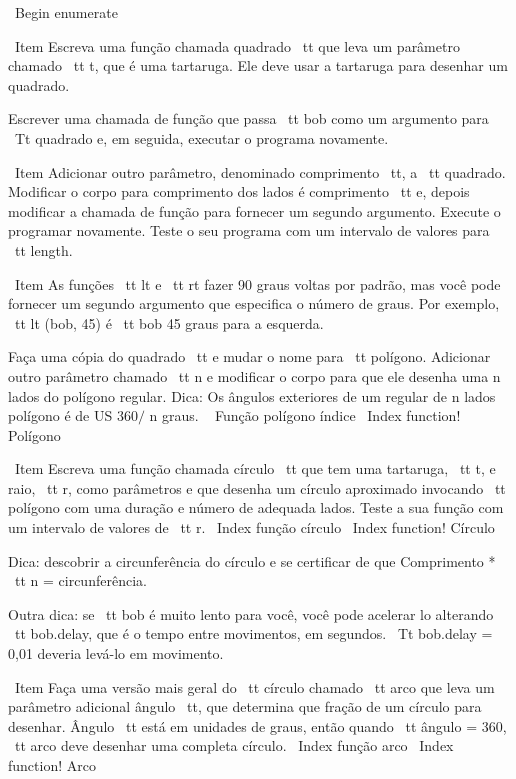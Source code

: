 \documentclass[10pt]{book}
\begin{document}
{\ Begin {enumerate}

\ Item Escreva uma função chamada {quadrado \ tt} que leva um parâmetro
chamado {\ tt t}, que é uma tartaruga. Ele deve usar a tartaruga para desenhar
um quadrado.

Escrever uma chamada de função que passa {\ tt bob} como um argumento para
{\ Tt quadrado} e, em seguida, executar o programa novamente.

\ Item Adicionar outro parâmetro, denominado {comprimento \ tt}, a {\ tt quadrado}.
Modificar o corpo para comprimento dos lados é {comprimento \ tt} e, depois
modificar a chamada de função para fornecer um segundo argumento. Execute o
programar novamente. Teste o seu programa com um intervalo de valores para {\ tt
length}.

\ Item As funções {\ tt lt} e {\ tt rt} fazer 90 graus voltas por
padrão, mas você pode fornecer um segundo argumento que especifica o
número de graus. Por exemplo, {\ tt lt (bob, 45)} é {\ tt bob} 45
graus para a esquerda.

Faça uma cópia do quadrado {\ tt} e mudar o nome para {\ tt polígono}. Adicionar
outro parâmetro chamado {\ tt n} e modificar o corpo para que ele desenha uma
n lados do polígono regular. Dica: Os ângulos exteriores de um regular de n lados
polígono é de US $ 360 / $ n graus.
\ {} Função polígono índice
\ Index {function! Polígono}

\ Item Escreva uma função chamada {círculo \ tt} que tem uma tartaruga, {\ tt t},
e raio, {\ tt r}, como parâmetros e que desenha um círculo aproximado
invocando {\ tt polígono} com uma duração e número de adequada
lados. Teste a sua função com um intervalo de valores de {\ tt r}.
\ Index {função círculo}
\ Index {function! Círculo}

Dica: descobrir a circunferência do círculo e se certificar de que
{Comprimento * \ tt n = circunferência}.

Outra dica: se {\ tt bob} é muito lento para você, você pode acelerar
lo alterando {\ tt bob.delay}, que é o tempo entre movimentos,
em segundos. {\ Tt bob.delay = 0,01} deveria levá-lo em movimento.


\ Item Faça uma versão mais geral do {\ tt círculo} chamado {\ tt arco}
que leva um parâmetro adicional {ângulo \ tt}, que determina
que fração de um círculo para desenhar. {Ângulo \ tt} está em unidades de
graus, então quando {\ tt ângulo = 360}, {\ tt arco} deve desenhar uma completa
círculo.
\ Index {função arco}
\ Index {function! Arco}

}
\end{document}
